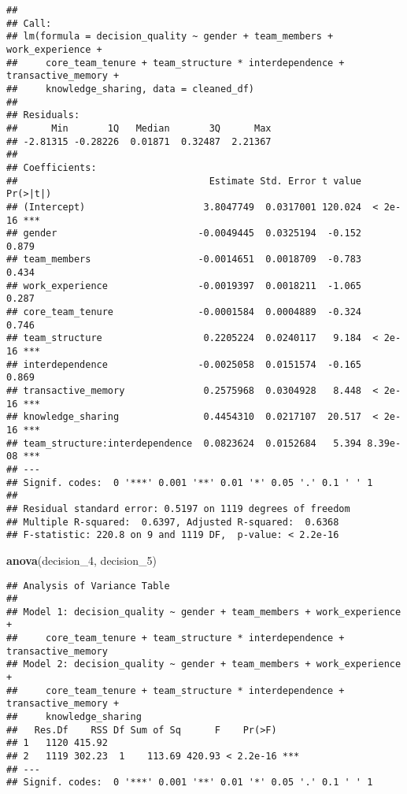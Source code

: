 \documentclass[]{article}
\newenvironment{Shaded}{\begin{snugshade}}{\end{snugshade}}
\newcommand{\DecValTok}[1]{\textcolor[rgb]{0.00,0.00,0.81}{#1}}
\newcommand{\KeywordTok}[1]{\textcolor[rgb]{0.13,0.29,0.53}{\textbf{#1}}}
\newcommand{\NormalTok}[1]{#1}
\begin{document}
\begin{verbatim}
## 
## Call:
## lm(formula = decision_quality ~ gender + team_members + work_experience + 
##     core_team_tenure + team_structure * interdependence + transactive_memory + 
##     knowledge_sharing, data = cleaned_df)
## 
## Residuals:
##      Min       1Q   Median       3Q      Max 
## -2.81315 -0.28226  0.01871  0.32487  2.21367 
## 
## Coefficients:
##                                  Estimate Std. Error t value Pr(>|t|)    
## (Intercept)                     3.8047749  0.0317001 120.024  < 2e-16 ***
## gender                         -0.0049445  0.0325194  -0.152    0.879    
## team_members                   -0.0014651  0.0018709  -0.783    0.434    
## work_experience                -0.0019397  0.0018211  -1.065    0.287    
## core_team_tenure               -0.0001584  0.0004889  -0.324    0.746    
## team_structure                  0.2205224  0.0240117   9.184  < 2e-16 ***
## interdependence                -0.0025058  0.0151574  -0.165    0.869    
## transactive_memory              0.2575968  0.0304928   8.448  < 2e-16 ***
## knowledge_sharing               0.4454310  0.0217107  20.517  < 2e-16 ***
## team_structure:interdependence  0.0823624  0.0152684   5.394 8.39e-08 ***
## ---
## Signif. codes:  0 '***' 0.001 '**' 0.01 '*' 0.05 '.' 0.1 ' ' 1
## 
## Residual standard error: 0.5197 on 1119 degrees of freedom
## Multiple R-squared:  0.6397, Adjusted R-squared:  0.6368 
## F-statistic: 220.8 on 9 and 1119 DF,  p-value: < 2.2e-16
\end{verbatim}

\begin{Shaded}
\begin{Highlighting}[]
\KeywordTok{anova}\NormalTok{(decision_}\DecValTok{4}\NormalTok{, decision_}\DecValTok{5}\NormalTok{)}
\end{Highlighting}
\end{Shaded}

\begin{verbatim}
## Analysis of Variance Table
## 
## Model 1: decision_quality ~ gender + team_members + work_experience + 
##     core_team_tenure + team_structure * interdependence + transactive_memory
## Model 2: decision_quality ~ gender + team_members + work_experience + 
##     core_team_tenure + team_structure * interdependence + transactive_memory + 
##     knowledge_sharing
##   Res.Df    RSS Df Sum of Sq      F    Pr(>F)    
## 1   1120 415.92                                  
## 2   1119 302.23  1    113.69 420.93 < 2.2e-16 ***
## ---
## Signif. codes:  0 '***' 0.001 '**' 0.01 '*' 0.05 '.' 0.1 ' ' 1
\end{verbatim}
\end{document}
